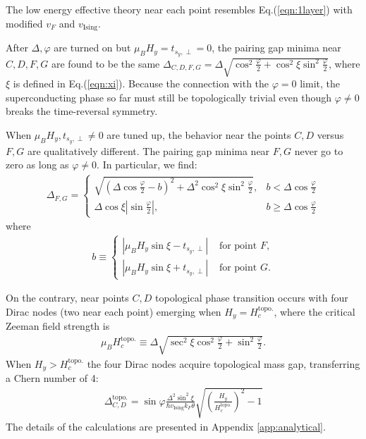 The low energy effective theory near each point resembles Eq.(\ref{eqn:1layer}) with modified $v_F$ and $v_{\text{Ising}}$.

After $\Delta,\varphi$ are turned on but $\mu_B H_y=t_{s_y,\perp}=0$, the pairing gap minima near $C,D,F,G$ are found to be the same $\Delta_{C,D,F,G}=\Delta\sqrt{\cos^2\frac{\varphi}{2}+\cos^2\xi\sin^2\frac{\varphi}{2}}$, where $\xi$ is defined in Eq.(\ref{eqn:xi}).
Because the connection with the $\varphi=0$ limit, the superconducting phase so far must still be topologically trivial even though $\varphi\neq 0$ breaks the time-reversal symmetry.

When $\mu_B H_y,t_{s_y,\perp} \neq 0$ are tuned up, the behavior near the points $C,D$ versus $F,G$ are qualitatively different. The pairing gap minima near $F,G$ never go to zero as long as $\varphi\neq 0$. In particular, we find:
\begin{align}
    \Delta_{F,G}=\left\{\begin{array} {cc} \sqrt{(\Delta\cos\frac{\varphi}{2}-b)^2+\Delta^2\cos^2\xi\sin^2\frac{\varphi}{2}}, & b<\Delta\cos\frac{\varphi}{2}\\ \Delta\cos\xi|\sin\frac{\varphi}{2}|,&  b\geq \Delta\cos\frac{\varphi}{2}\end{array}\right.\label{eqn:gap_FG}
\end{align}
where
\begin{align}
    b\equiv
    \begin{cases}
        |\mu_B H_y\sin\xi -t_{s_y,\perp}| & \mbox{ for point } F,\\
        |\mu_B H_y\sin\xi + t_{s_y,\perp}| & \mbox{ for point } G.
    \end{cases}
\end{align}

On the contrary, near points $C,D$ topological phase transition occurs with four Dirac nodes (two near each point) emerging when $H_y=H^{\text{topo.}}_{c}$, where the critical Zeeman field strength is
\begin{align}
    \mu_B H^{\mathrm{topo.}}_{c}\equiv\Delta\sqrt{\sec^2\xi\cos^2\frac{\varphi}{2}+\sin^2\frac{\varphi}{2}}.\label{eqn:Hc_topo}
\end{align}
When $H_y> H^{\mathrm{topo.}}_{c}$ the four Dirac nodes acquire topological mass gap, transferring a Chern number of 4:
\begin{align}
    \Delta^{\text{topo.}}_{C,D}=\sin\varphi\frac{\Delta^2\sin^2\xi}{\hbar v_{\text{Ising}}k_F\theta}\sqrt{\left(\frac{H_y}{H^{\text{topo.}}_{c}}\right)^2-1}\label{eqn:topo_gap}
\end{align}
The details of the calculations are presented in Appendix \ref{app:analytical}.

